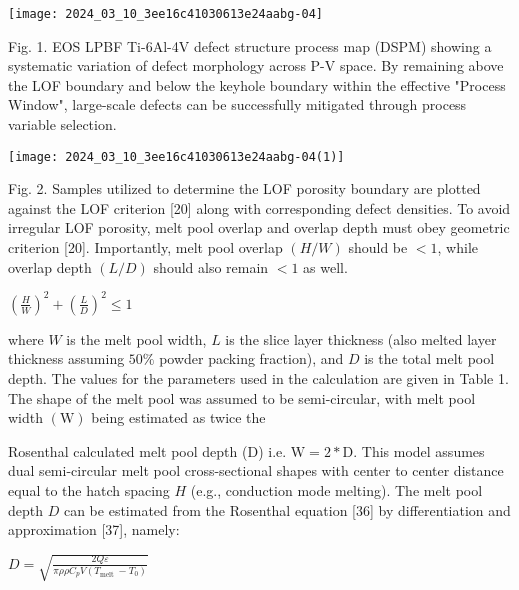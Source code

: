 \documentclass[10pt]{article}
\begin{document}
\begin{center}
\texttt{[image: 2024\_03\_10\_3ee16c41030613e24aabg-04]}
\end{center}

Fig. 1. EOS LPBF Ti-6Al-4V defect structure process map (DSPM) showing a systematic variation of defect morphology across P-V space. By remaining above the LOF boundary and below the keyhole boundary within the effective "Process Window", large-scale defects can be successfully mitigated through process variable selection.

\begin{center}
\texttt{[image: 2024\_03\_10\_3ee16c41030613e24aabg-04(1)]}
\end{center}

Fig. 2. Samples utilized to determine the LOF porosity boundary are plotted against the LOF criterion [20] along with corresponding defect densities. To avoid irregular LOF porosity, melt pool overlap and overlap depth must obey geometric criterion [20]. Importantly, melt pool overlap $(H / W)$ should be $<1$, while overlap depth $(L / D)$ should also remain $<1$ as well.

$\left(\frac{H}{W}\right)^{2}+\left(\frac{L}{D}\right)^{2} \leq 1$

where $W$ is the melt pool width, $L$ is the slice layer thickness (also melted layer thickness assuming $50 \%$ powder packing fraction), and $D$ is the total melt pool depth. The values for the parameters used in the calculation are given in Table 1. The shape of the melt pool was assumed to be semi-circular, with melt pool width $(\mathrm{W})$ being estimated as twice the

Rosenthal calculated melt pool depth (D) i.e. $\mathrm{W}=2 * \mathrm{D}$. This model assumes dual semi-circular melt pool cross-sectional shapes with center to center distance equal to the hatch spacing $H$ (e.g., conduction mode melting). The melt pool depth $D$ can be estimated from the Rosenthal equation [36] by differentiation and approximation [37], namely:

$D=\sqrt{\frac{2 Q \varepsilon}{\pi \rho \rho C_{p} V\left(T_{\text {melt }}-T_{0}\right)}}$
\end{document}
